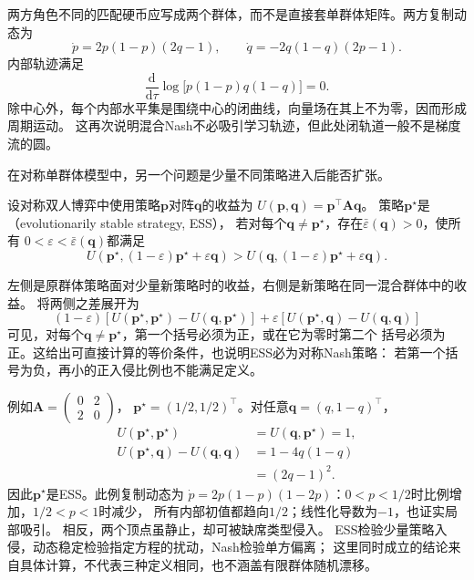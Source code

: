两方角色不同的匹配硬币应写成两个群体，而不是直接套单群体矩阵。两方复制动态为
\[
  \dot p=2p(1-p)(2q-1),\qquad
  \dot q=-2q(1-q)(2p-1).
\]
内部轨迹满足
\[
  \frac{\mathrm d}{\mathrm d\tau}
  \log\!\bigl[p(1-p)q(1-q)\bigr]=0.
\]
除中心外，每个内部水平集是围绕中心的闭曲线，向量场在其上不为零，因而形成周期运动。
这再次说明混合Nash不必吸引学习轨迹，但此处闭轨道一般不是梯度流的圆。

在对称单群体模型中，另一个问题是少量不同策略进入后能否扩张。
\begin{definition}[演化稳定策略]
\label{def:game-evolutionarily-stable}
设对称双人博弈中使用策略\(\bm p\)对阵\(\bm q\)的收益为
\(U(\bm p,\bm q)=\bm p^\top\bm A\bm q\)。
策略\(\bm p^\star\)是（evolutionarily stable strategy, ESS），
若对每个\(\bm q\ne\bm p^\star\)，存在\(\bar\varepsilon(\bm q)>0\)，使所有
\(0<\varepsilon<\bar\varepsilon(\bm q)\)都满足
\[
  U(\bm p^\star,(1-\varepsilon)\bm p^\star+\varepsilon\bm q)
  >
  U(\bm q,(1-\varepsilon)\bm p^\star+\varepsilon\bm q).
\]
\end{definition}
左侧是原群体策略面对少量新策略时的收益，右侧是新策略在同一混合群体中的收益。
将两侧之差展开为
\[
  (1-\varepsilon)
  [U(\bm p^\star,\bm p^\star)-U(\bm q,\bm p^\star)]
  +\varepsilon[U(\bm p^\star,\bm q)-U(\bm q,\bm q)]
\]
可见，对每个\(\bm q\ne\bm p^\star\)，第一个括号必须为正，或在它为零时第二个
括号必须为正。这给出可直接计算的等价条件，也说明ESS必为对称Nash策略：
若第一个括号为负，再小的正入侵比例也不能满足定义。

例如\(\bm A=\left(\begin{smallmatrix}0&2\\2&0\end{smallmatrix}\right)\)，
\(\bm p^\star=(1/2,1/2)^\top\)。对任意\(\bm q=(q,1-q)^\top\)，
\[
  \begin{aligned}
    U(\bm p^\star,\bm p^\star)&=U(\bm q,\bm p^\star)=1,\\
    U(\bm p^\star,\bm q)-U(\bm q,\bm q)&=1-4q(1-q)\\
      &=(2q-1)^2.
  \end{aligned}
\]
因此\(\bm p^\star\)是ESS。此例复制动态为
\(\dot p=2p(1-p)(1-2p)\)：\(0<p<1/2\)时比例增加，\(1/2<p<1\)时减少，
所有内部初值都趋向\(1/2\)；线性化导数为\(-1\)，也证实局部吸引。
相反，两个顶点虽静止，却可被缺席类型侵入。
ESS检验少量策略入侵，动态稳定检验指定方程的扰动，Nash检验单方偏离；
这里同时成立的结论来自具体计算，不代表三种定义相同，也不涵盖有限群体随机漂移。

